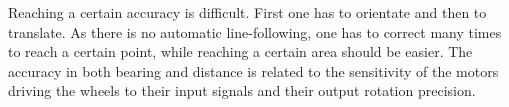 Reaching a certain accuracy is difficult. First one has to
orientate and then to translate. As there is no automatic line-following, one
has to correct many times to reach a certain point, while reaching a certain
area should be easier. The accuracy in both bearing and distance is related
to the sensitivity of the motors driving the wheels to their input signals and
their output rotation precision.
